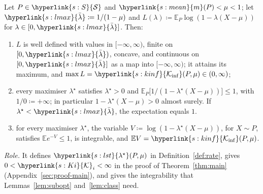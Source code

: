 \documentclass[11pt]{article}
\newcommand{\E}{\mathbb{E}}
\newcommand{\dt}[1]{\hypertarget{#1}{}}
\newcommand{\sy}[2]{{\hyperlink{#1}{#2}}}
\newcommand{\Sm}{\sy{s:S}{\mathcal{S}}}
\newcommand{\mean}{\sy{s:mean}{m}}
\newcommand{\Kinf}{\sy{s:kinf}{\mathcal{K}_{\inf}}}
\newcommand{\lst}{\sy{s:lst}{\lambda^{\star}}}
\newcommand{\Ki}{\sy{s:Ki}{\mathcal{K}}}
\newcommand{\lmax}{\sy{s:lmax}{\bar{\lambda}}}
\begin{document}
\begin{lemma}\label{lem:optimizer}
Let $P\in\Sm$ and $\mean(P)<\mu<1$; let \dt{s:lmax}$\lmax\coloneqq1/(1-\mu)$ and
$L(\lambda)\coloneqq\E_P\log(1-\lambda(X-\mu))$ for $\lambda\in[0,\lmax]$. Then:
\begin{enumerate}[label=(\alph*)]
\item $L$ is well defined with values in $[-\infty,\infty)$, finite on $[0,\lmax)$, concave, and
  continuous on $[0,\lmax]$ as a map into $[-\infty,\infty)$; it attains its maximum, and
  $\max L=\Kinf(P,\mu)\in(0,\infty)$;
\item every maximiser $\lambda^\star$ satisfies $\lambda^\star>0$ and
  $\E_P\big[1/(1-\lambda^\star(X-\mu))\big]\le1$, with $1/0\coloneqq+\infty$; in particular
  $1-\lambda^\star(X-\mu)>0$ almost surely. If $\lambda^\star<\lmax$, the expectation equals $1$.
\item for every maximiser $\lambda^\star$, the variable $V\coloneqq\log(1-\lambda^\star(X-\mu))$, for
  $X\sim P$, satisfies $\E e^{-V}\le1$, is integrable, and $\E V=\Kinf(P,\mu)$.
\end{enumerate}
\end{lemma}

\emph{Role.} It defines $\lst(P,\mu)$ in Definition~\ref{def:rate}, gives
$0<\Ki_i<\infty$ in the proof of Theorem~\ref{thm:main} (Appendix~\ref{sec:proof-main}), and gives the integrability that
Lemmas~\ref{lem:subopt} and~\ref{lem:class} need.
\end{document}
